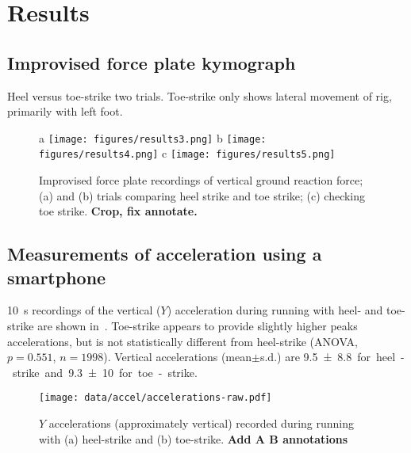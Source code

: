\section{Results}
\label{sec:results}

\subsection{Improvised force plate kymograph}
Heel versus toe-strike two trials. Toe-strike only shows lateral movement of rig, primarily with left foot. 
\begin{figure}
\begin{center}
a \texttt{[image: figures/results3.png]}
b \texttt{[image: figures/results4.png]}
c \texttt{[image: figures/results5.png]}
\end{center}
\caption{Improvised force plate recordings of vertical ground reaction force; (a) and (b) trials comparing heel strike and toe strike; (c) checking toe strike. \textbf{Crop, fix annotate.}}
\label{fig:results:forceplate}
\end{figure}





\subsection{Measurements of acceleration using a smartphone}
\SI{10}{\second} recordings of the vertical ($Y$) acceleration during running with heel- and toe-strike are shown in~. Toe-strike appears to provide slightly higher peaks accelerations, but is not statistically different from heel-strike (ANOVA, $p=0.551$, $n=1998$). Vertical accelerations (mean$\pm$s.d.) are \SI{9.5\pm8.8} for heel-strike and \SI{9.3\pm10} for toe-strike. 
\begin{figure}
\begin{center}
\texttt{[image: data/accel/accelerations-raw.pdf]}
\end{center}
\caption{$Y$ accelerations (approximately vertical) recorded during running with (a) heel-strike and (b) toe-strike. \textbf{Add A B annotations}}
\label{fig:results:accel}
\end{figure}





